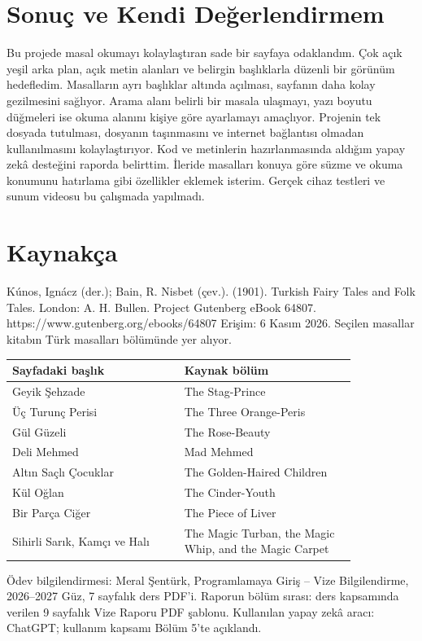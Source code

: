\documentclass[11pt,a4paper]{article}
\begin{document}
\section{Sonuç ve Kendi Değerlendirmem}
Bu projede masal okumayı kolaylaştıran sade bir sayfaya odaklandım. Çok açık yeşil arka plan, açık metin alanları ve belirgin başlıklarla düzenli bir görünüm hedefledim. Masalların ayrı başlıklar altında açılması, sayfanın daha kolay gezilmesini sağlıyor. Arama alanı belirli bir masala ulaşmayı, yazı boyutu düğmeleri ise okuma alanını kişiye göre ayarlamayı amaçlıyor. Projenin tek dosyada tutulması, dosyanın taşınmasını ve internet bağlantısı olmadan kullanılmasını kolaylaştırıyor. Kod ve metinlerin hazırlanmasında aldığım yapay zekâ desteğini raporda belirttim. İleride masalları konuya göre süzme ve okuma konumunu hatırlama gibi özellikler eklemek isterim. Gerçek cihaz testleri ve sunum videosu bu çalışmada yapılmadı.

\section{Kaynakça}
Kúnos, Ignácz (der.); Bain, R. Nisbet (çev.). (1901). Turkish Fairy Tales and Folk Tales. London: A. H. Bullen. Project Gutenberg eBook 64807. https://www.gutenberg.org/ebooks/64807 Erişim: 6 Kasım 2026. Seçilen masallar kitabın Türk masalları bölümünde yer alıyor.

\begin{longtable}{|p{0.42\linewidth}|p{0.42\linewidth}|}
\hline \textbf{Sayfadaki başlık} & \textbf{Kaynak bölüm} \\ \hline\endhead
Geyik Şehzade & The Stag-Prince \\ \hline
Üç Turunç Perisi & The Three Orange-Peris \\ \hline
Gül Güzeli & The Rose-Beauty \\ \hline
Deli Mehmed & Mad Mehmed \\ \hline
Altın Saçlı Çocuklar & The Golden-Haired Children \\ \hline
Kül Oğlan & The Cinder-Youth \\ \hline
Bir Parça Ciğer & The Piece of Liver \\ \hline
Sihirli Sarık, Kamçı ve Halı & The Magic Turban, the Magic Whip, and the Magic Carpet \\ \hline
\end{longtable}
Ödev bilgilendirmesi: Meral Şentürk, Programlamaya Giriş – Vize Bilgilendirme, 2026–2027 Güz, 7 sayfalık ders PDF’i. Raporun bölüm sırası: ders kapsamında verilen 9 sayfalık Vize Raporu PDF şablonu. Kullanılan yapay zekâ aracı: ChatGPT; kullanım kapsamı Bölüm 5’te açıklandı.
\end{document}
